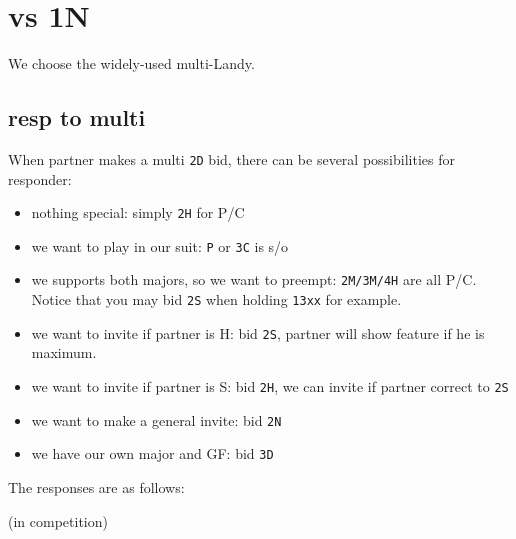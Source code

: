 \section{vs 1N}

We choose the widely-used multi-Landy.



\subsection{resp to multi}

When partner makes a multi \texttt{2D} bid, there can be several possibilities for responder:
\begin{itemize}
    \setlength{\itemsep}{0pt}
    \item nothing special: simply \texttt{2H} for P/C
    \item we want to play in our suit: \texttt{P} or \texttt{3C} is s/o
    \item we supports both majors, so we want to preempt: \texttt{2M/3M/4H} are all P/C. Notice that you may bid \texttt{2S} when holding \texttt{13xx} for example.
    \item we want to invite if partner is H: bid \texttt{2S}, partner will show feature if he is maximum.
    \item we want to invite if partner is S: bid \texttt{2H}, we can invite if partner correct to \texttt{2S}
    \item we want to make a general invite: bid \texttt{2N}
    \item we have our own major and GF: bid \texttt{3D}
\end{itemize}

The responses are as follows:


(in competition)
